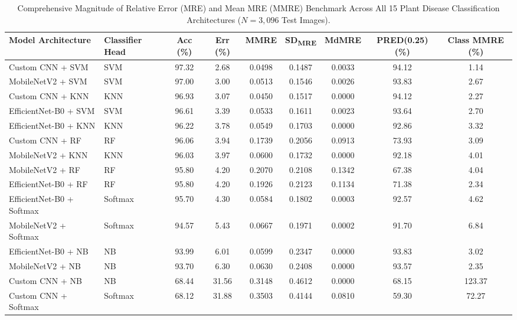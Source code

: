 \begin{table}[t]
\caption{Comprehensive Magnitude of Relative Error (MRE) and Mean MRE (MMRE) Benchmark Across All 15 Plant Disease Classification Architectures ($N=3{,}096$ Test Images).}
\label{tab:mre_mmre_benchmark}
\centering
\footnotesize
\begin{tabular}{llccccccc}
\toprule
\textbf{Model Architecture} & \textbf{Classifier Head} & \textbf{Acc (\%)} & \textbf{Err (\%)} & \textbf{MMRE} & \textbf{SD\textsubscript{MRE}} & \textbf{MdMRE} & \textbf{PRED(0.25) (\%)} & \textbf{Class MMRE (\%)} \\
\midrule
Custom CNN + SVM & SVM & 97.32 & 2.68 & 0.0498 & 0.1487 & 0.0033 & 94.12 & 1.14 \\
MobileNetV2 + SVM & SVM & 97.00 & 3.00 & 0.0513 & 0.1546 & 0.0026 & 93.83 & 2.67 \\
Custom CNN + KNN & KNN & 96.93 & 3.07 & 0.0450 & 0.1517 & 0.0000 & 94.12 & 2.27 \\
EfficientNet-B0 + SVM & SVM & 96.61 & 3.39 & 0.0533 & 0.1611 & 0.0023 & 93.64 & 2.70 \\
EfficientNet-B0 + KNN & KNN & 96.22 & 3.78 & 0.0549 & 0.1703 & 0.0000 & 92.86 & 3.32 \\
Custom CNN + RF & RF & 96.06 & 3.94 & 0.1739 & 0.2056 & 0.0913 & 73.93 & 3.09 \\
MobileNetV2 + KNN & KNN & 96.03 & 3.97 & 0.0600 & 0.1732 & 0.0000 & 92.18 & 4.01 \\
MobileNetV2 + RF & RF & 95.80 & 4.20 & 0.2070 & 0.2108 & 0.1342 & 67.38 & 4.04 \\
EfficientNet-B0 + RF & RF & 95.80 & 4.20 & 0.1926 & 0.2123 & 0.1134 & 71.38 & 2.34 \\
EfficientNet-B0 + Softmax & Softmax & 95.70 & 4.30 & 0.0584 & 0.1802 & 0.0003 & 92.57 & 4.62 \\
MobileNetV2 + Softmax & Softmax & 94.57 & 5.43 & 0.0667 & 0.1971 & 0.0002 & 91.70 & 6.84 \\
EfficientNet-B0 + NB & NB & 93.99 & 6.01 & 0.0599 & 0.2347 & 0.0000 & 93.83 & 3.02 \\
MobileNetV2 + NB & NB & 93.70 & 6.30 & 0.0630 & 0.2408 & 0.0000 & 93.57 & 2.35 \\
Custom CNN + NB & NB & 68.44 & 31.56 & 0.3148 & 0.4612 & 0.0000 & 68.15 & 123.37 \\
Custom CNN + Softmax & Softmax & 68.12 & 31.88 & 0.3503 & 0.4144 & 0.0810 & 59.30 & 72.27 \\
\bottomrule
\end{tabular}
\end{table}
